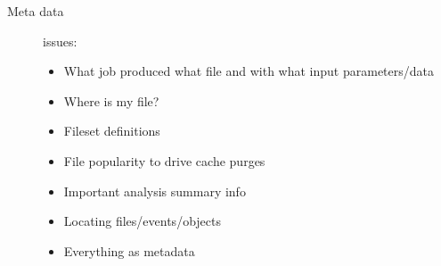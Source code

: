\begin{description}
\begin{itemize}
  \end{itemize}
\item[Meta data] issues:
  \begin{itemize}
  \item What job produced what file and with what input parameters/data
  \item Where is my file?
  \item Fileset definitions
  \item File popularity to drive cache purges
  \item Important analysis summary info
  \item Locating files/events/objects
  \item Everything as metadata
  \end{itemize}
\end{description}


